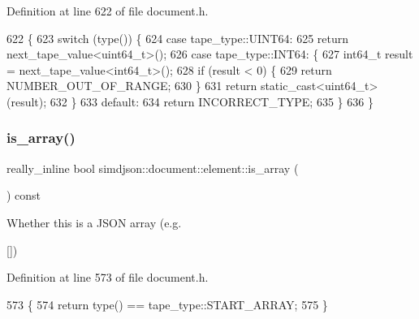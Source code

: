 Definition at line 622 of file document.\+h.


\begin{DoxyCode}
622                                                                                     \{
623   \textcolor{keywordflow}{switch} (type()) \{
624     \textcolor{keywordflow}{case} tape\_type::UINT64:
625       \textcolor{keywordflow}{return} next\_tape\_value<uint64\_t>();
626     \textcolor{keywordflow}{case} tape\_type::INT64: \{
627       int64\_t result = next\_tape\_value<int64\_t>();
628       \textcolor{keywordflow}{if} (result < 0) \{
629         \textcolor{keywordflow}{return} NUMBER\_OUT\_OF\_RANGE;
630       \}
631       \textcolor{keywordflow}{return} \textcolor{keyword}{static\_cast<}uint64\_t\textcolor{keyword}{>}(result);
632     \}
633     \textcolor{keywordflow}{default}:
634       \textcolor{keywordflow}{return} INCORRECT\_TYPE;
635   \}
636 \}
\end{DoxyCode}
\mbox{\label{classsimdjson_1_1document_1_1element_a65800f96c37e88e89ab36d3bb3202f27}} 
\subsubsection{\texorpdfstring{is\+\_\+array()}{is\_array()}}
{\footnotesize\ttfamily really\+\_\+inline bool simdjson\+::document\+::element\+::is\+\_\+array (\begin{DoxyParamCaption}{ }\end{DoxyParamCaption}) const\hspace{0.3cm}{\ttfamily [noexcept]}}



Whether this is a J\+S\+ON array (e.\+g. 

\mbox{[}\mbox{]}) 

Definition at line 573 of file document.\+h.


\begin{DoxyCode}
573                                                             \{
574   \textcolor{keywordflow}{return} type() == tape\_type::START\_ARRAY;
575 \}
\end{DoxyCode}
\mbox{\label{classsimdjson_1_1document_1_1element_ab022f58390a1553a581d9c6668eb53ba}} 
